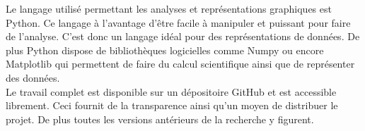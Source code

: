 Le langage utilisé permettant les analyses et représentations graphiques est Python. Ce langage à l'avantage d'être facile à manipuler et puissant pour faire de l'analyse. C'est donc un langage idéal pour des représentations de données. De plus Python dispose de bibliothèques logicielles comme Numpy ou encore Matplotlib qui permettent de faire du calcul scientifique ainsi que de représenter des données.\\

Le travail complet est disponible sur un dépositoire GitHub et est accessible librement. Ceci fournit de la transparence ainsi qu'un moyen de distribuer le projet. De plus toutes les versions antérieurs de la recherche y figurent.
